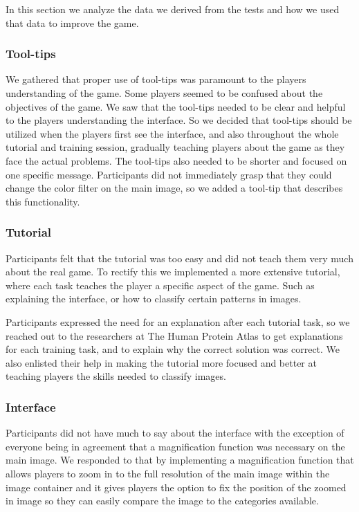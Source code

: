 In this section we analyze the data we derived from the tests and how we used that data to improve the game.

\subsubsection{Tool-tips}
We gathered that proper use of tool-tips was paramount to the players understanding of the game. Some players seemed to be confused about the objectives of the game. We saw that the tool-tips needed to be clear and helpful to the players understanding the interface. So we decided that tool-tips should be utilized when the players first see the interface, and also throughout the whole tutorial and training session, gradually teaching players about the game as they face the actual problems. The tool-tips also needed to be shorter and focused on one specific message. Participants did not immediately grasp that they could change the color filter on the main image, so we added a tool-tip that describes this functionality.

\subsubsection{Tutorial}
Participants felt that the tutorial was too easy and did not teach them very much about the real game. To rectify this we implemented a more extensive tutorial, where each task teaches the player a specific aspect of the game. Such as explaining the interface, or how to classify certain patterns in images. 

Participants expressed the need for an explanation after each tutorial task, so we reached out to the researchers at The Human Protein Atlas to get explanations for each training task, and to explain why the correct solution was correct. We also enlisted their help in making the tutorial more focused and better at teaching players the skills needed to classify images.

\subsubsection{Interface}
Participants did not have much to say about the interface with the exception of everyone being in agreement that a magnification function was necessary on the main image. We responded to that by implementing a magnification function that allows players to zoom in to the full resolution of the main image within the image container and it gives players the option to fix the position of the zoomed in image so they can easily compare the image to the categories available.

